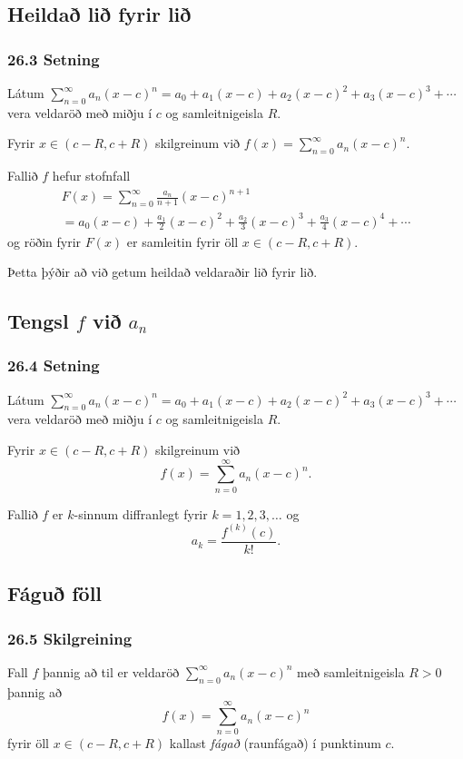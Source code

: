 \subsection[t]{Heildað lið fyrir lið}
 \subsubsection{26.3 Setning}
Látum 
$\sum_{n=0}^\infty a_n(x-c)^n=a_0+a_1(x-c)+a_2(x-c)^2+a_3(x-c)^3+\cdots$
vera veldaröð með miðju í $c$ og samleitnigeisla $R$. \pause
\pause

Fyrir $x\in(c-R, c+R)$ skilgreinum við 
$f(x)=\sum_{n=0}^\infty a_n(x-c)^n$.
\pause

Fallið $f$ hefur stofnfall
\begin{multline*}
F(x)=\sum_{n=0}^\infty \frac{a_n}{n+1}(x-c)^{n+1} \\
=a_0(x-c)+\frac{a_1}{2}(x-c)^2+\frac{a_2}{3}(x-c)^3+
\frac{a_3}{4}(x-c)^4+\cdots
\end{multline*}
\pause og röðin fyrir $F(x)$  er samleitin fyrir öll
$x\in(c-R, c+R)$.
\pause

Þetta þýðir að við getum heildað veldaraðir lið fyrir lið.
 





\subsection[t]{Tengsl $f$ við $a_n$}
 \subsubsection{26.4 Setning}
Látum 
$\sum_{n=0}^\infty a_n(x-c)^n=a_0+a_1(x-c)+a_2(x-c)^2+a_3(x-c)^3+\cdots$
vera veldaröð með miðju í $c$ og samleitnigeisla $R$. \pause

 Fyrir
$x\in(c-R, c+R)$ skilgreinum við 
$$f(x)=\sum_{n=0}^\infty a_n(x-c)^n.$$
\pause

Fallið $f$ er $k$-sinnum diffranlegt fyrir $k=1, 2, 3, \ldots$ og
$$a_k=\frac{f^{(k)}(c)}{k!}.$$
 


\subsection[t]{Fáguð föll}
 \subsubsection{26.5 Skilgreining}  
Fall $f$ þannig að til er veldaröð $\sum_{n=0}^\infty a_n(x-c)^n$ með
samleitnigeisla $R>0$ þannig að 
$$f(x)=\sum_{n=0}^\infty a_n(x-c)^n$$
fyrir öll $x\in(c-R, c+R)$ kallast {\em fágað} (raunfágað) í punktinum
$c$.
 

